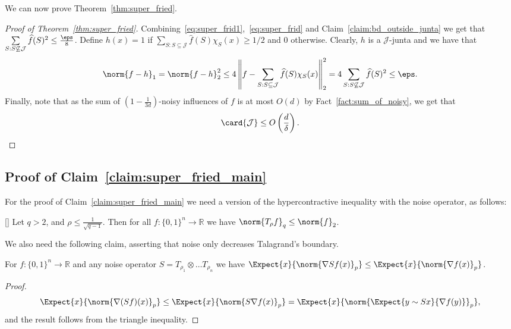   We can now prove Theorem~\ref{thm:super_fried}.
  \begin{proof}[Proof of Theorem~\ref{thm:super_fried}]
    Combining~\eqref{eq:super_frid1},~\eqref{eq:super_frid} and Claim~\ref{claim:bd_outside_junta} we get that
    $\sum\limits_{S: S\not\subseteq \mathcal{J}}\widehat{f}(S)^2\leq \frac{\eps}{8}$.
    Define $h(x) = 1$ if $\sum\limits_{S: S\subseteq \mathcal{J}}\widehat{f}(S)\chi_S(x)\geq 1/2$ and $0$ otherwise.
    Clearly, $h$ is a $\mathcal{J}$-junta and we have that
    \[
    \norm{f-h}_1
    =
    \norm{f-h}_2^2
    \leq 4\left\|f-\sum\limits_{S: S\subseteq \mathcal{J}}\widehat{f}(S)\chi_S(x)\right\|_2^2
    =4\sum\limits_{S: S\not\subseteq \mathcal{J}}\widehat{f}(S)^2\leq \eps.
    \]
    Finally, note that as the sum of $\left(1-\frac{1}{3d}\right)$-noisy influences of $f$ is at most $O(d)$ by Fact~\ref{fact:sum_of_noisy}, we get that
    \[
    \card{\mathcal{J}}\leq O\left(\frac{d}{\delta}\right).
    \qedhere
    \]
  \end{proof}

\subsection{Proof of Claim~\ref{claim:super_fried_main}}\label{sec:missing_proofs}
For the proof of Claim~\ref{claim:super_fried_main} we need a version of the hypercontractive inequality with the noise operator, as follows:
\begin{lemma}\label{lemma:hypercontractivity_noise}[\cite{ODonnell}]
  Let $q>2$, and $\rho\leq \frac{1}{\sqrt{q-1}}$. Then for all $f\colon\{0,1\}^n\to\mathbb{R}$ we have
  $\norm{T_{\rho} f}_q\leq \norm{f}_2$.
\end{lemma}

We also need the following claim, asserting that noise only decreases Talagrand's boundary.
\begin{claim}\label{claim:noise_decreases_tal}
  For $f\colon \{0,1\}^n\to\mathbb{R}$ and any noise operator $S = T_{\rho_1}\otimes\ldots T_{\rho_n}$ we have
  $\Expect{x}{\norm{\nabla{S f}(x)}_p}\leq \Expect{x}{\norm{\nabla{f}(x)}_p}$.
\end{claim}
\begin{proof}
  \[\Expect{x}{\norm{\nabla (S f)(x)}_p}
  \leq
  \Expect{x}{\norm{S \nabla f(x)}_p}
  =\Expect{x}{\norm{\Expect{y\sim S x}{\nabla f(y)}}_p},
  \]
  and the result follows from the triangle inequality.
\end{proof}


